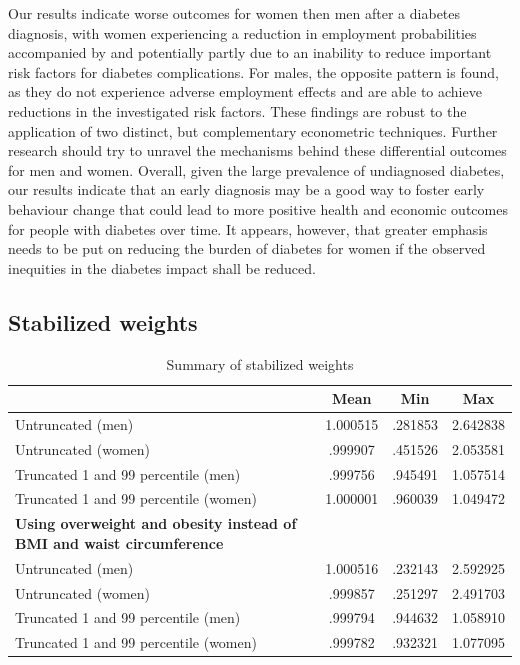 Our results indicate worse outcomes for women then men after a diabetes diagnosis, with women experiencing a reduction in employment probabilities accompanied by and potentially partly due to an inability to reduce important risk factors for diabetes complications. For males, the opposite pattern is found, as they do not experience adverse employment effects and are able to achieve reductions in the investigated risk factors. These findings are robust to the application of two distinct, but complementary econometric techniques. Further research should try to unravel the mechanisms behind these differential outcomes for men and women. Overall, given the large prevalence of undiagnosed diabetes, our results indicate that an early diagnosis may be a good way to foster early behaviour change that could lead to more positive health and economic outcomes for people with diabetes over time. It appears, however, that greater emphasis needs to be put on reducing the burden of diabetes for women if the observed inequities in the diabetes impact shall be reduced. 

\clearpage

\subsection*{Stabilized weights}

\begin{table}[!ht]
\caption{\label{tab:stabweights}Summary of stabilized weights}
\begin{adjustbox}{max width=\linewidth}  
{
\def\sym#1{\ifmmode^{#1}\else\(^{#1}\)\fi}
\begin{tabular}{l*{1}{ccc}}
\toprule
                    &        Mean&         Min&         Max\\
\midrule
Untruncated (men)   &   1.000515&    .281853&    2.642838\\
Untruncated (women) &   .999907&    .451526&    2.053581\\
Truncated 1 and 99 percentile (men)&    .999756&      .945491&    1.057514\\
Truncated 1 and 99 percentile (women)&    1.000001&    .960039&    1.049472\\
\midrule
\textbf{Using overweight and obesity instead of BMI and waist circumference}\\
Untruncated (men)   &   1.000516&    .232143&    2.592925\\
Untruncated (women) &   .999857&    .251297&    2.491703\\
Truncated 1 and 99 percentile (men)&    .999794&      .944632&    1.058910\\
Truncated 1 and 99 percentile (women)&    .999782&    .932321&    1.077095\\
\bottomrule
\end{tabular}
}
\end{adjustbox}
\end{table}

